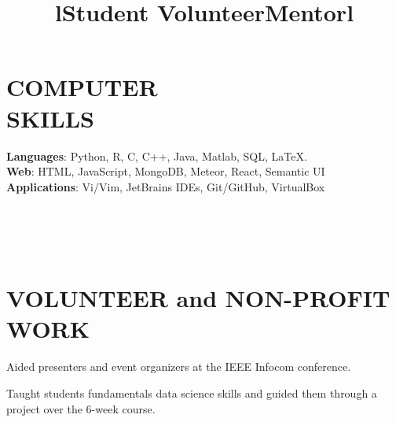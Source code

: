 \documentclass[margin]{res}
\begin{document}
\begin{resume}
\section{COMPUTER\\SKILLS}

\textbf{Languages}: Python, R, C, C++, Java, Matlab, SQL, \LaTeX.
\\
\textbf{Web}: HTML, JavaScript, MongoDB, Meteor, React, Semantic UI
\\
\textbf{Applications}: Vi/Vim, JetBrains IDEs, Git/GitHub, VirtualBox


\begin{format}
\title{l}\\
\\
\body\\
\end{format}

\section{VOLUNTEER and NON-PROFIT WORK}
\title{\textbf{Student Volunteer}}
\begin{position}
Aided presenters and event organizers at the IEEE Infocom conference.
\end{position}

\title{\textbf{Mentor}}
\begin{position}
Taught students fundamentals data science skills and guided them through a project over the 6-week course.
\end{position}


\begin{format}
\title{l}\\
\\
\body\\
\end{format}


\end{resume}
\end{document}
